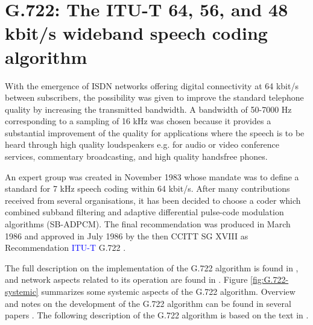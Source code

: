 \chapter{G.722: The ITU-T 64, 56, and 48 kbit/s wideband
         speech coding algorithm}

With the emergence of ISDN networks offering digital connectivity at
64 kbit/s between subscribers, the possibility was given to improve
the standard telephone quality by increasing the transmitted
bandwidth. A bandwidth of 50-7000 Hz corresponding to a sampling of 16
kHz was chosen because it provides a substantial improvement of the
quality for applications where the speech is to be heard through
high quality loudspeakers e.g. for audio or video conference services,
commentary broadcasting, and high quality handsfree phones.

An expert group was created in November 1983 whose mandate was to
define a standard for 7 kHz speech coding within 64 kbit/s. After many
contributions received from several organisations, it has been decided
to choose a coder which combined subband filtering and adaptive
differential pulse-code modulation algorithms (SB-ADPCM). The final
recommendation was produced in March 1986 and approved in July 1986 by
the then CCITT SG XVIII as Recommendation \textcolor{blue}{ITU-T} G.722 \cite{G.722}.

The full description on the implementation of the G.722 algorithm is
found in \cite{G.722}, and network aspects related to its operation
are found in \cite{G.725}. Figure \ref{fig:G.722-systemic} summarizes
some systemic aspects of the G.722 algorithm. Overview and notes on
the development of the G.722 algorithm can be found in several papers
\cite{G.722:General,G.722:Overview,G.722:SubjTest,G.722:Implementation,
 G.722:Modes,G.722:Applications}.  The following description of the
G.722 algorithm is based on the text in \cite{G.722:Summary}.

